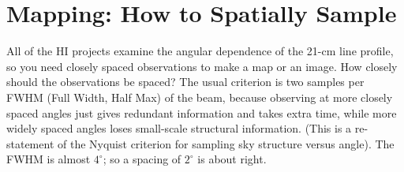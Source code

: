 \documentclass[psfig,preprint]{aastex}
\begin{document}
 
\section{Mapping: How to Spatially Sample} \label{sampling} 

\noindent
All of the HI projects examine the angular dependence of the 21-cm line
profile, so you need closely spaced observations to make a map or an
image. How closely should the observations be spaced?  The usual
criterion is two samples per FWHM (Full Width, Half Max) of the beam, because
observing at more closely spaced angles just gives redundant information
and takes extra time, while more widely spaced angles loses small-scale
structural information. (This is a re-statement of the Nyquist criterion for sampling
sky structure versus angle).  The FWHM is
almost $4^\circ$; so a spacing of $2^\circ$ is about right.
\end{document}
